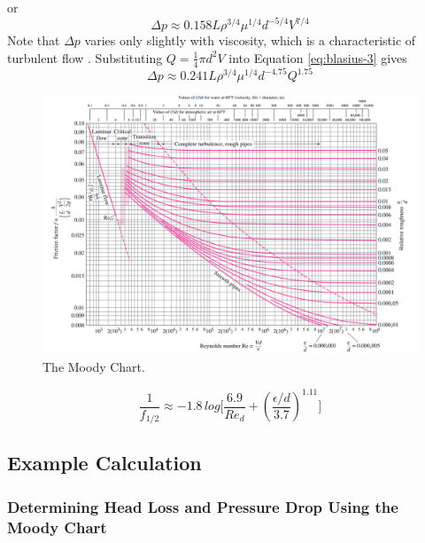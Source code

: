 \documentclass[11pt]{article} %
\numberwithin{equation}{section} %
\begin{document}
or
\begin{equation} \label{eq:blasius-3}
\Delta p \approx 0.158 L \rho^{3/4} \mu^{1/4} d^{-5/4} V^{7/4}
\end{equation}
Note that $\Delta p$ varies only slightly with viscosity, which is a characteristic of turbulent flow \cite{fluid-mechanics}. Substituting $Q = \frac{1}{4} \pi d^{2} V$ into Equation \ref{eq:blasius-3} gives
\begin{equation}
\Delta p \approx 0.241 L \rho^{3/4} \mu^{1/4} d^{-4.75} Q^{1.75}
\end{equation}

\begin{figure}[!htb]
\centering
\includegraphics[scale=0.55]{moody_chart}
\caption{The Moody Chart.}
\label{fig:moody-chart}
\end{figure}

\begin{equation}
\frac{1}{f_{1/2}} \approx -1.8\, log \big[ \frac{6.9}{Re_{d}} + \left( \frac{\epsilon / d}{3.7} \right)^{1.11} \big]
\end{equation}

\subsection{Example Calculation}
\subsubsection{Determining Head Loss and Pressure Drop Using the Moody Chart}
\end{document}
